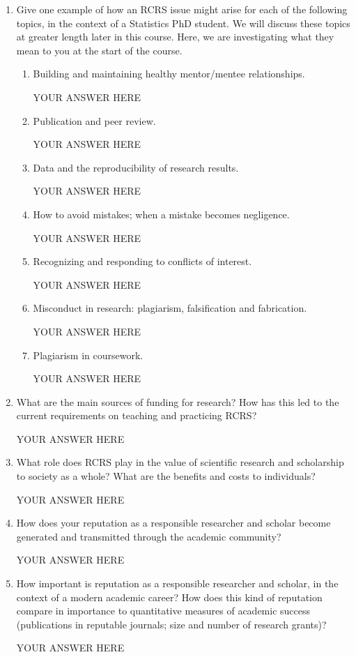 \documentclass[12pt]{article}
\begin{document}
\begin{enumerate}
\item Give one example of how an RCRS issue might arise for each of the following topics, in the context of a Statistics PhD student. We will discuss these topics at greater length later in this course. Here, we are investigating what they mean to you at the start of the course.
\begin{enumerate}
\item Building and maintaining healthy mentor/mentee relationships.

YOUR ANSWER HERE

\item Publication and peer review. 

YOUR ANSWER HERE

\item Data and the reproducibility of research results.

YOUR ANSWER HERE

\item How to avoid mistakes; when a mistake becomes negligence.

YOUR ANSWER HERE

\item Recognizing and responding to conflicts of interest.

YOUR ANSWER HERE

\item Misconduct in research: plagiarism, falsification and fabrication.

YOUR ANSWER HERE

\item Plagiarism in coursework.

YOUR ANSWER HERE

\end{enumerate}

\item What are the main sources of funding for research? How has this led to the current requirements on teaching and practicing RCRS?

YOUR ANSWER HERE

\item What role does RCRS play in the value of scientific research and scholarship to society as a whole? What are the benefits and costs to individuals?


YOUR ANSWER HERE

\item How does your reputation as a responsible researcher and scholar become generated and transmitted through the academic community?

YOUR ANSWER HERE

\item How important is reputation as a responsible researcher and scholar, in the context of a modern academic career? How does this kind of reputation compare in importance to quantitative measures of academic success (publications in reputable journals; size and number of research grants)? 

YOUR ANSWER HERE

\end{enumerate}
\end{document}
